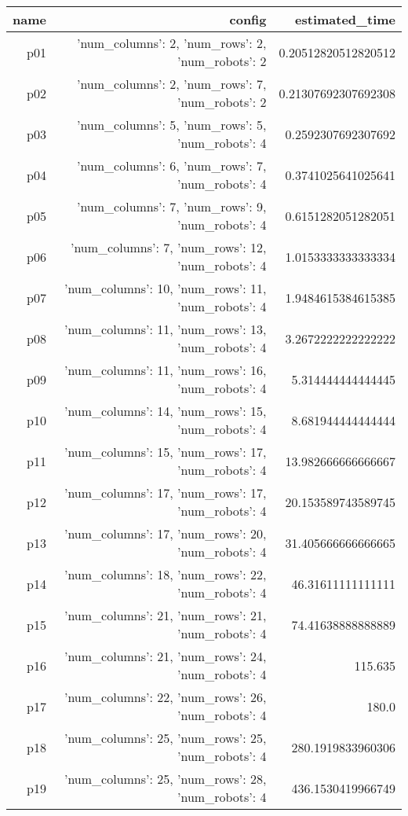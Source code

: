 \documentclass{article}
\begin{document}
                            \begin{center}
                            \scriptsize
                            \begin{tabular}{r|r|r}
                            name & config & estimated\_time\\\midrule
                              p01&{'num\_columns': 2, 'num\_rows': 2, 'num\_robots': 2}&0.20512820512820512\\
  p02&{'num\_columns': 2, 'num\_rows': 7, 'num\_robots': 2}&0.21307692307692308\\
  p03&{'num\_columns': 5, 'num\_rows': 5, 'num\_robots': 4}&0.2592307692307692\\
  p04&{'num\_columns': 6, 'num\_rows': 7, 'num\_robots': 4}&0.3741025641025641\\
  p05&{'num\_columns': 7, 'num\_rows': 9, 'num\_robots': 4}&0.6151282051282051\\
  p06&{'num\_columns': 7, 'num\_rows': 12, 'num\_robots': 4}&1.0153333333333334\\
  p07&{'num\_columns': 10, 'num\_rows': 11, 'num\_robots': 4}&1.9484615384615385\\
  p08&{'num\_columns': 11, 'num\_rows': 13, 'num\_robots': 4}&3.2672222222222222\\
  p09&{'num\_columns': 11, 'num\_rows': 16, 'num\_robots': 4}&5.314444444444445\\
  p10&{'num\_columns': 14, 'num\_rows': 15, 'num\_robots': 4}&8.681944444444444\\
  p11&{'num\_columns': 15, 'num\_rows': 17, 'num\_robots': 4}&13.982666666666667\\
  p12&{'num\_columns': 17, 'num\_rows': 17, 'num\_robots': 4}&20.153589743589745\\
  p13&{'num\_columns': 17, 'num\_rows': 20, 'num\_robots': 4}&31.405666666666665\\
  p14&{'num\_columns': 18, 'num\_rows': 22, 'num\_robots': 4}&46.31611111111111\\
  p15&{'num\_columns': 21, 'num\_rows': 21, 'num\_robots': 4}&74.41638888888889\\
  p16&{'num\_columns': 21, 'num\_rows': 24, 'num\_robots': 4}&115.635\\
  p17&{'num\_columns': 22, 'num\_rows': 26, 'num\_robots': 4}&180.0\\
  p18&{'num\_columns': 25, 'num\_rows': 25, 'num\_robots': 4}&280.1919833960306\\
  p19&{'num\_columns': 25, 'num\_rows': 28, 'num\_robots': 4}&436.1530419966749\\

\end{tabular}
\end{center}
\end{document}
